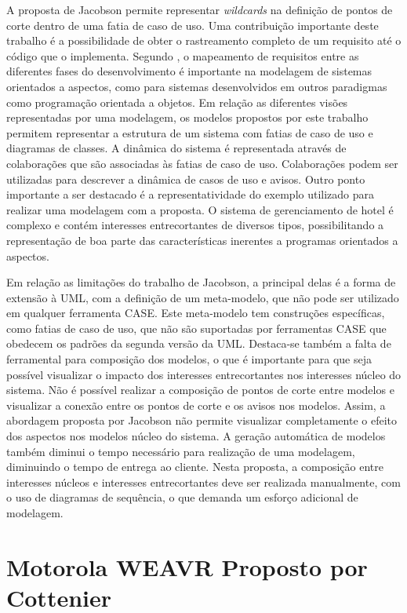 A proposta de Jacobson permite representar \textit{wildcards} na definição de pontos de corte dentro de uma fatia de caso de uso. Uma contribuição
importante deste trabalho é a possibilidade de obter o rastreamento completo de um requisito até o código que o implementa. Segundo \cite{wimmer:2011:SUA:1978802.1978807}, 
o mapeamento de requisitos entre as diferentes fases do desenvolvimento é importante na modelagem de sistemas orientados a aspectos, como para
sistemas desenvolvidos em outros paradigmas como programação orientada a objetos. Em relação as diferentes visões representadas por uma modelagem, os
modelos propostos por este trabalho permitem representar a estrutura de um sistema com fatias de caso de uso e diagramas de classes. A dinâmica do sistema 
é representada através de colaborações que são associadas às fatias de caso de uso. Colaborações podem ser utilizadas para descrever a dinâmica de
casos de uso e avisos. Outro ponto importante a ser destacado é a representatividade do exemplo utilizado para realizar uma modelagem com a proposta. 
O sistema de gerenciamento de hotel é complexo e contém interesses entrecortantes de diversos tipos, possibilitando a representação de boa parte das
características inerentes a programas orientados a aspectos.

Em relação as limitações do trabalho de Jacobson, a principal delas é a forma de extensão à UML, com a definição de um meta-modelo, que não pode ser utilizado 
em qualquer ferramenta CASE. Este meta-modelo tem construções específicas, como fatias de caso de uso, que não são suportadas por ferramentas CASE que
obedecem os padrões da segunda versão da UML. Destaca-se também a falta de ferramental para composição dos modelos, o que é
importante para que seja possível visualizar o impacto dos interesses entrecortantes nos interesses núcleo do sistema. Não é possível realizar a
composição de pontos de corte entre modelos e visualizar a conexão entre os pontos de corte e os avisos nos modelos. Assim, a abordagem proposta por
Jacobson não permite visualizar completamente o efeito dos aspectos nos modelos núcleo do sistema. A geração automática de modelos também diminui o
tempo necessário para realização de uma modelagem, diminuindo o tempo de entrega ao cliente. Nesta proposta, a composição entre interesses núcleos e
interesses entrecortantes deve ser realizada manualmente, com o uso de diagramas de sequência, o que demanda um esforço adicional de modelagem.

\section{Motorola WEAVR Proposto por Cottenier}

